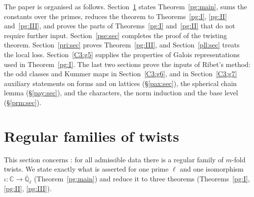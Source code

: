 \documentclass[10pt]{amsart}
\theoremstyle{definition}
\theoremstyle{remark}
\newcommand{\C}{\mathbb C}
\newcommand{\Z}{\mathbb Z}
\newcommand{\Q}{\mathbb Q}
\begin{document}
The paper is organised as follows. Section~\ref{pg:sec} states Theorem~\ref{pg:main}, sums the
constants over the primes, reduces the theorem to Theorems~\ref{pg:I}, \ref{pg:II}
and~\ref{pg:III}, and proves the parts of Theorems~\ref{pg:I} and~\ref{pg:II} that do not require
further input. Section~\ref{pse:sec} completes the proof of the twisting theorem.
Section~\ref{pri:sec} proves Theorem~\ref{pg:III}, and Section~\ref{pll:sec} treats the local
loss. Section~\ref{C3:g5} supplies the properties of Galois representations used in
Theorem~\ref{pg:I}. The last two sections prove the inputs of Ribet's method: the odd classes and
Kummer maps in Section~\ref{C3:g6}, and in Section~\ref{C3:g7} auxiliary statements on forms and
on lattices (\S\ref{pax:sec}), the spherical chain lemma (\S\ref{pay:sec}), and the characters,
the norm induction and the base level (\S\ref{prm:sec}).


\providecommand{\auO}{\mathcal O}
\providecommand{\auI}{\mathcal I}
\providecommand{\auQlb}{\overline{\Q}_\ell}
\providecommand{\auPl}{\Phi}
\providecommand{\auPb}{\Phi_b}
\providecommand{\auT}{\mathcal T}
\providecommand{\auG}{\overline G}
\providecommand{\audT}{d_{\auT}}
\providecommand{\auNm}{\operatorname{Nm}}
\providecommand{\auU}{\mathrm U}
\providecommand{\auGL}{\mathrm{GL}}
\providecommand{\auA}{\mathbb A}
\providecommand{\auF}{\mathbb F}
\providecommand{\aurd}{\mathrm{rd}_E}
\providecommand{\aueu}{\varepsilon_{\mathrm u}}
\providecommand{\aubud}{\mathrm{bud}}
\providecommand{\aubar}[1]{\overline{#1}}
\providecommand{\auf}[1]{\texttt{#1}}
\providecommand{\pgZb}{\overline{\Z}_\ell}
\providecommand{\pgv}{v}
\providecommand{\pgNch}{N_{\mathrm{ch}}}
\providecommand{\pgcodd}{c_{\mathrm{odd}}}
\providecommand{\pgloc}{\mathrm{loc}}
\providecommand{\pgG}{G_E}
\providecommand{\pgSel}{\operatorname{Sel}}
\providecommand{\pglen}{\operatorname{len}}
\providecommand{\pgtr}{\operatorname{tr}}
\providecommand{\pgFrob}{\operatorname{Frob}}
\providecommand{\pgHom}{\operatorname{Hom}}
\providecommand{\pgS}{S_{\mathrm{bad}}}
\providecommand{\pgcyc}{\varepsilon_\ell}
\providecommand{\pgpr}{\operatorname{pr}}

\section{Regular families of twists}\label{pg:sec}

This section concerns {\cite[Proposition~14.40]{P46}}: for all admissible data there is a regular
family of $m$-fold twists. We state exactly what is asserted for one prime $\ell$ and one
isomorphism $\iota\colon\C\to\auQlb$ (Theorem~\ref{pg:main}) and reduce it to three theorems
(Theorems~\ref{pg:I}, \ref{pg:II}, \ref{pg:III}).
\end{document}

